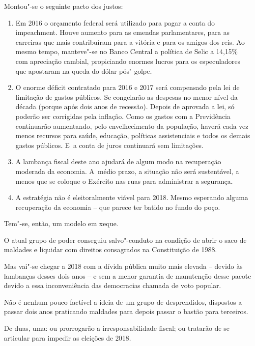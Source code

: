 Montou"-se o seguinte pacto dos justos:

\begin{enumerate}
\itemsep1pt\parskip0pt
\item
  Em 2016 o orçamento federal será utilizado para pagar a conta do
  impeachment. Houve aumento para as emendas parlamentares, para as
  carreiras que mais contribuíram para a vitória e para os amigos dos
  reis. Ao mesmo tempo, manteve"-se no Banco Central a política de Selic
  a 14,15\% com apreciação cambial, propiciando enormes lucros para os
  especuladores que apostaram na queda do dólar pós"-golpe.
\item
  O enorme déficit contratado para 2016 e 2017 será compensado pela lei
  de limitação de gastos públicos. Se congelarão as despesas no menor
  nível da década (porque após dois anos de recessão). Depois de
  aprovada a lei, só poderão ser corrigidas pela inflação. Como os
  gastos com a Previdência continuarão aumentando, pelo envelhecimento
  da população, haverá cada vez menos recursos para saúde, educação,
  políticas assistenciais e todos os demais gastos públicos. E~a conta
  de juros continuará sem limitações.
\item
  A lambança fiscal deste ano ajudará de algum modo na recuperação
  moderada da economia. A~médio prazo, a situação não será sustentável,
  a menos que se coloque o Exército nas ruas para administrar a
  segurança.
\item
  A estratégia não é eleitoralmente viável para 2018. Mesmo esperando
  alguma recuperação da economia -- que parece ter batido no fundo do
  poço.
\end{enumerate}

Tem"-se, então, um modelo em xeque.

O atual grupo de poder conseguiu salvo"-conduto na condição de abrir o
saco de maldades e liquidar com direitos consagrados na Constituição de
1988.

Mas vai"-se chegar a 2018 com a dívida pública muito mais elevada --
devido às lambanças desses dois anos -- e sem a menor garantia de
manutenção desse pacote devido a essa inconveniência das democracias
chamada de voto popular.

Não é nenhum pouco factível a ideia de um grupo de desprendidos,
dispostos a passar dois anos praticando maldades para depois passar o
bastão para terceiros.

De duas, uma: ou prorrogarão a irresponsabilidade fiscal; ou tratarão de
se articular para impedir as eleições de 2018.

